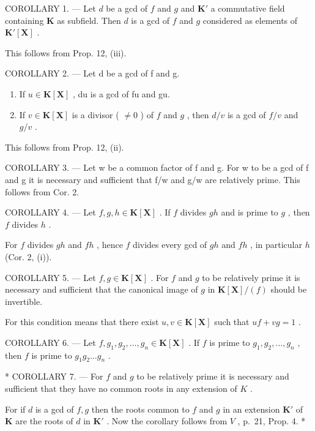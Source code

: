 COROLLARY 1. --- Let \(d\) be a gcd of \(f\) and \(g\) and \(\mathbf{K}'\) a commutative field containing \(\mathbf{K}\) as subfield. Then \(d\) is a gcd of \(f\) and \(g\) considered as elements of \(\mathbf{K}'[\mathbf{X}]\) .

This follows from Prop. 12, (iii).

COROLLARY 2. --- Let d be a gcd of f and g.

\begin{enumerate}
\def\labelenumi{(\roman{enumi})}
\item
  If \(u \in \mathbf{K}[\mathbf{X}]\) , du is a gcd of fu and gu.
\item
  If \(v \in \mathbf{K}[\mathbf{X}]\) is a divisor ( \(\neq 0\) ) of \(f\) and \(g\) , then \(d / v\) is a gcd of \(f / v\) and \(g / v\) .
\end{enumerate}

This follows from Prop. 12, (ii).

COROLLARY 3. --- Let w be a common factor of f and g. For w to be a gcd of f and g it is necessary and sufficient that f/w and g/w are relatively prime. This follows from Cor. 2.

COROLLARY 4. --- Let \(f, g, h \in \mathbf{K}[\mathbf{X}]\) . If \(f\) divides \(gh\) and is prime to \(g\) , then \(f\) divides \(h\) .

For \(f\) divides \(gh\) and \(fh\) , hence \(f\) divides every gcd of \(gh\) and \(fh\) , in particular \(h\) (Cor. 2, (i)).

COROLLARY 5. --- Let \(f, g \in \mathbf{K}[\mathbf{X}]\) . For \(f\) and \(g\) to be relatively prime it is necessary and sufficient that the canonical image of \(g\) in \(\mathbf{K}[\mathbf{X}] / (f)\) should be invertible.

For this condition means that there exist \(u, v \in \mathbf{K}[\mathbf{X}]\) such that \(uf + vg = 1\) .

COROLLARY 6. --- Let \(f, g_1, g_2, \ldots, g_n \in \mathbf{K}[\mathbf{X}]\) . If \(f\) is prime to \(g_1, g_2, \ldots, g_n\) , then \(f\) is prime to \(g_1g_2\ldots g_n\) .

* COROLLARY 7. --- For \(f\) and \(g\) to be relatively prime it is necessary and sufficient that they have no common roots in any extension of \(K\) .

For if \(d\) is a gcd of \(f, g\) then the roots common to \(f\) and \(g\) in an extension \(\mathbf{K}'\) of \(\mathbf{K}\) are the roots of \(d\) in \(\mathbf{K}'\) . Now the corollary follows from \(V\) , p.~21, Prop. 4. *

